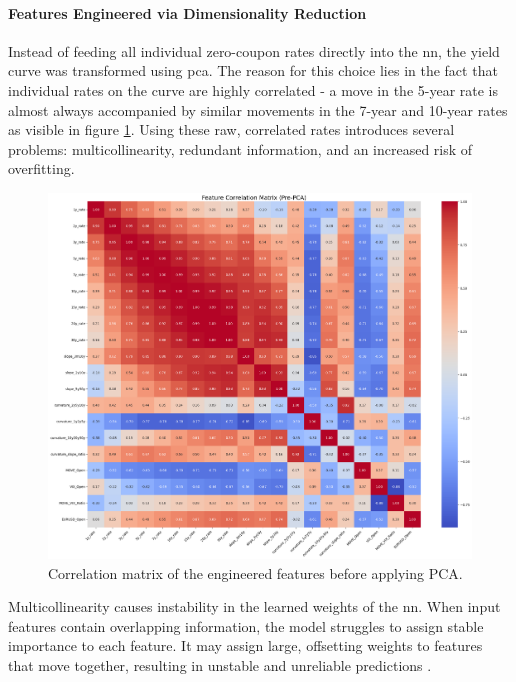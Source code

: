 \paragraph{Features Engineered via Dimensionality Reduction}
Instead of feeding all individual zero-coupon rates directly into the \ac{nn}, the yield curve was transformed using \ac{pca}. The reason for this choice lies in the fact that individual rates on the curve are highly correlated - a move in the 5-year rate is almost always accompanied by similar movements in the 7-year and 10-year rates as visible in figure \ref{fig:feature_correlation_prePCA}. Using these raw, correlated rates introduces several problems: multicollinearity, redundant information, and an increased risk of overfitting.

\begin{figure}[H]
	\centering
	\includegraphics[width=1\textwidth]{images/features/feature_correlation_matrixPre-PCA.png}
	\caption{Correlation matrix of the engineered features before applying PCA.}
	\label{fig:feature_correlation_prePCA}
\end{figure}

Multicollinearity causes instability in the learned weights of the \ac{nn}. When input features contain overlapping information, the model struggles to assign stable importance to each feature. It may assign large, offsetting weights to features that move together, resulting in unstable and unreliable predictions \parencite[p.~2]{chan2022multicollinearity}.

